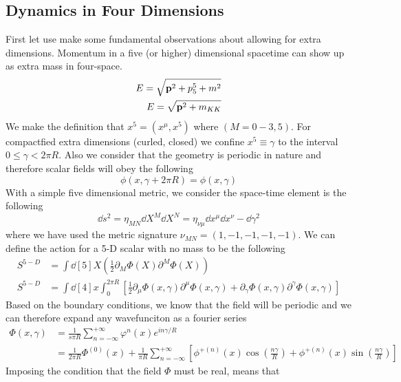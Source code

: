 \documentclass[12pt]{article}
\newcommand{\pd}{\partial}
\renewcommand{\vb}{\vectorbold}
\begin{document}
\subsection{Dynamics in Four Dimensions}
First let use make some fundamental observations about allowing for extra
dimensions. Momentum in a five (or higher) dimensional spacetime can show up as
extra mass in four-space. 
\begin{align}
    E = \sqrt{\vb{p}^2 + p_5^5 + m^2} \\
    E = \sqrt{\vb{p}^2 + m_{KK}}
\end{align}
We make the definition that $x^5 = (x^\mu,x^5)$ where $(M = 0-3,5)$. For
compactfied extra dimensions (curled, closed) we confine $x^5 \equiv \gamma$ to
the interval $0 \leq \gamma < 2\pi R$. Also we consider that the geometry is
periodic in nature and therefore scalar fields will obey the following
\begin{equation}
    \phi(x, \gamma + 2\pi R) = \phi (x,\gamma)
\end{equation}
With a simple five dimensional metric, we consider the space-time element is the
following
\begin{equation}
    \dd{s}^2 = \eta_{MN}\dd{X}^M\dd{X}^N = \eta_{\nu\mu}\dd{x}^\mu\dd{x}^\nu -
    \dd{\gamma}^2
\end{equation}
where we have used the metric signature $\nu_{MN} = (1,-1,-1,-1,-1)$.
We can define the action for a 5-D scalar with no mass to be the following
\begin{align}
    S^{5-D} &= \int \dd[5]{X} \left( \frac{1}{2} \pd_M \Phi(X) \pd^M
    \Phi(X) \right) \\
        S^{5-D} &= \int \dd[4]{x} \int^{2\pi R}_{0} \left[ \frac{1}{2} \pd_\mu \Phi(x,\gamma) \pd^\mu
    \Phi(x,\gamma) + \pd_\gamma \Phi(x,\gamma) \pd^\gamma
    \Phi(x,\gamma) \right]
\end{align}
Based on the boundary conditions, we know that the field will be periodic and we
can therefore expand any wavefunciton as a fourier series
\begin{align}
    \Phi(x,\gamma) &= \frac{1}{s\pi R} \sum^{+\infty}_{n=-\infty}
    \varphi^{n}(x)e^{in\gamma /R} \\
                   &= \frac{1}{2\pi R} \Phi^{(0)}(x) + \frac{1}{\pi R}
                   \sum^{+\infty}_{n=-\infty} \left[
                       \phi^{+(n)}(x)\cos\left( \frac{n\gamma}{R} \right) +
               \phi^{+(n)}(x)\sin\left( \frac{n\gamma}{R} \right) \right]
\end{align}
Imposing the condition that the field $\Phi$ must be real, means that
\end{document}
